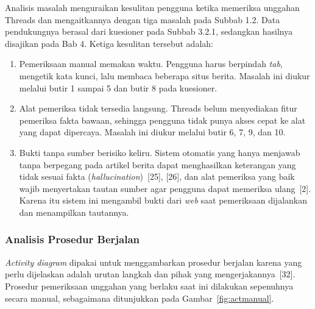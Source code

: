 \documentclass[12pt,a4paper,twoside]{report}
\begin{document}
Analisis masalah menguraikan kesulitan pengguna ketika memeriksa unggahan Threads dan mengaitkannya dengan tiga masalah pada Subbab 1.2. Data pendukungnya berasal dari kuesioner pada Subbab 3.2.1, sedangkan hasilnya disajikan pada Bab 4. Ketiga kesulitan tersebut adalah:
\begin{enumerate}[leftmargin=0.8cm,itemsep=3pt,topsep=2pt]
  \item Pemeriksaan manual memakan waktu. Pengguna harus berpindah \textit{tab}, mengetik kata kunci, lalu membaca beberapa situs berita. Masalah ini diukur melalui butir 1 sampai 5 dan butir 8 pada kuesioner.
  \item Alat pemeriksa tidak tersedia langsung. Threads belum menyediakan fitur pemeriksa fakta bawaan, sehingga pengguna tidak punya akses cepat ke alat yang dapat dipercaya. Masalah ini diukur melalui butir 6, 7, 9, dan 10.
  \item Bukti tanpa sumber berisiko keliru. Sistem otomatis yang hanya menjawab tanpa berpegang pada artikel berita dapat menghasilkan keterangan yang tidak sesuai fakta (\textit{hallucination})~[25], [26], dan alat pemeriksa yang baik wajib menyertakan tautan sumber agar pengguna dapat memeriksa ulang~[2]. Karena itu sistem ini mengambil bukti dari \textit{web} saat pemeriksaan dijalankan dan menampilkan tautannya.
\end{enumerate}

\subsubsection{Analisis Prosedur Berjalan}

\textit{Activity diagram} dipakai untuk menggambarkan prosedur berjalan karena yang perlu dijelaskan adalah urutan langkah dan pihak yang mengerjakannya~[32]. Prosedur pemeriksaan unggahan yang berlaku saat ini dilakukan sepenuhnya secara manual, sebagaimana ditunjukkan pada Gambar~\ref{fig:actmanual}.
\end{document}
